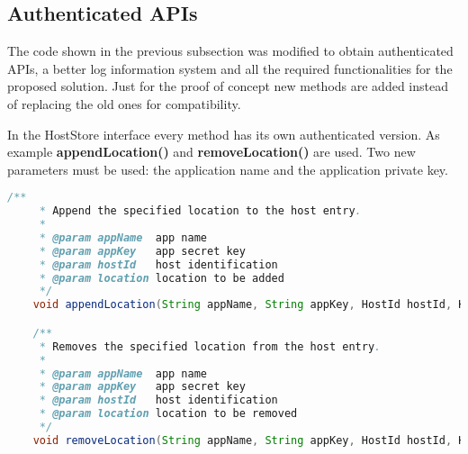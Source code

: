 \documentclass[a4paper,10pt]{memoir}
\begin{document}
\subsection{Authenticated APIs}
The code shown in the previous subsection was modified to obtain authenticated APIs, a better log information system and all the required functionalities for the proposed solution. Just for the proof of concept new methods are added instead of replacing the old ones for compatibility.
\medskip

In the HostStore interface every method has its own authenticated version. As example \textbf{appendLocation()} and \textbf{removeLocation()} are used. Two new parameters must be used: the application name and the application private key.
\begin{lstlisting}[language=java,firstnumber=102]
    /**
     * Append the specified location to the host entry.
     *
     * @param appName  app name 
     * @param appKey   app secret key 
     * @param hostId   host identification
     * @param location location to be added
     */
    void appendLocation(String appName, String appKey, HostId hostId, HostLocation location);

    /**
     * Removes the specified location from the host entry.
     *
     * @param appName  app name 
     * @param appKey   app secret key 
     * @param hostId   host identification
     * @param location location to be removed
     */
    void removeLocation(String appName, String appKey, HostId hostId, HostLocation location);
\end{lstlisting}

\end{document}
